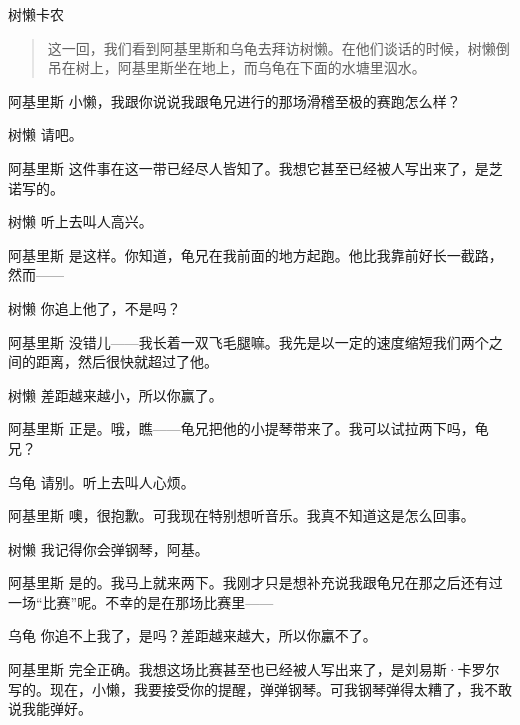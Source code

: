 
\begin{dialog}{树懒卡农}

\begin{quote}
这一回，我们看到阿基里斯和乌龟去拜访树懒。在他们谈话的时候，树懒倒吊在树上，阿基里斯坐在地上，而乌龟在下面的水塘里泅水。
\end{quote}

\begin{dialogue}

\item[阿基里斯]小懒，我跟你说说我跟龟兄进行的那场滑稽至极的赛跑怎么样？

\item[树懒]请吧。

\item[阿基里斯]这件事在这一带已经尽人皆知了。我想它甚至已经被人写出来了，是芝诺写的。

\item[树懒]听上去叫人高兴。

\item[阿基里斯]是这样。你知道，龟兄在我前面的地方起跑。他比我靠前好长一截路，然而——

\item[树懒]你追上他了，不是吗？

\item[阿基里斯]没错儿——我长着一双飞毛腿嘛。我先是以一定的速度缩短我们两个之间的距离，然后很快就超过了他。

\item[树懒]差距越来越小，所以你赢了。

\item[阿基里斯]正是。哦，瞧——龟兄把他的小提琴带来了。我可以试拉两下吗，龟兄？

\item[乌龟]请别。听上去叫人心烦。

\item[阿基里斯]噢，很抱歉。可我现在特别想听音乐。我真不知道这是怎么回事。

\item[树懒]我记得你会弹钢琴，阿基。

\item[阿基里斯]是的。我马上就来两下。我刚才只是想补充说我跟龟兄在那之后还有过一场“比赛”呢。不幸的是在那场比赛里——

\item[乌龟]你追不上我了，是吗？差距越来越大，所以你臝不了。

\item[阿基里斯]完全正确。我想这场比赛甚至也已经被人写出来了，是刘易斯·卡罗尔写的。现在，小懒，我要接受你的提醒，弹弹钢琴。可我钢琴弹得太糟了，我不敢说我能弹好。


\end{dialogue}
\end{dialog}

